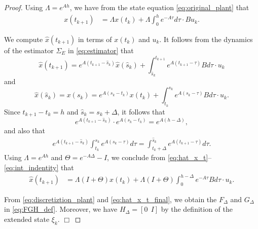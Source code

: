 \documentclass[letterpaper, 12pt, draftcls, onecolumn]{ieeeconf}
\begin{document}
\begin{proof}
	Using $\Lambda = e^{Ah}$,
	we have from the state equation
	\eqref{eq:original_plant} that
	\begin{align}
	\label{eq:discretiztion_plant}
	x(t_{k+1}) 
&=
	\Lambda x(t_k) + \Lambda 
	\int^{h}_{0} e^{-A\tau}  d\tau \cdot Bu_k.
	\end{align}
	
	We compute $\hat x(t_{k+1})$ in terms of $x(t_{k})$ and $u_k$.
	It follows from 
	the dynamics of the estimator $\Sigma_E$ in \eqref{eq:estimator} that
	\begin{equation}
	\label{eq:hat_x_t}
	\hat x(t_{k+1}) = 
	e^{A(t_{k+1} - \hat s_k)} \hat x(\hat s_{k})
	+ 
	\int^{t_{k+1}}_{\hat s_k} e^{A(t_{k+1} - \tau)} B d\tau \cdot u_k
	\end{equation}
	and
	\begin{equation}
	\label{eq:hat_x_hat_s}
	\hat x(\hat s_{k}) = x(s_k) = 
	e^{A(s_k-t_k)} x(t_k) + 
	\int^{s_{k}}_{t_k} e^{A(s_k - \tau)} B d\tau \cdot u_k.	
	\end{equation}
Since $t_{k+1} - t_{k} = h$ and $\hat s_{k} = s_k + \Delta$, it follows that
	\begin{equation}
	\label{eq:exp_identity}
	e^{A(t_{k+1} - \hat s_k)} \cdot e^{A(s_k-t_k)}
	= e^{A(h-\Delta)},
	\end{equation}
	and also that 
	\begin{align}
	\label{eq:int_indentity}
	e^{A(t_{k+1} - \hat s_k)}
	\int^{s_{k}}_{t_k} e^{A(s_k - \tau)} d\tau
	=
	\int^{\hat s_{k}}_{t_k+\Delta} e^{A(t_{k+1}  - \tau)} d\tau.
	\end{align}
	Using $\Lambda = e^{Ah}$ and $\Theta = e^{-A\Delta} - I$,
	we conclude 
from \eqref{eq:hat_x_t}--\eqref{eq:int_indentity} that
	\begin{align}
	\hat x(t_{k+1}) &= 
	\Lambda (I + \Theta) x(t_k) + 
	\Lambda (I + \Theta) \int^{h-\Delta}_{0} e^{-A\tau} B d\tau \cdot u_k.
	\label{eq:hat_x_t_final}
	\end{align}
	
	From \eqref{eq:discretiztion_plant} and \eqref{eq:hat_x_t_final},
	we obtain the $F_{\Delta}$ and $G_{\Delta}$ in \eqref{eq:FGH_def}.
	Moreover, 
	we have $H_{\Delta} = [0 ~~I]$
	by the definition of the extended state $\xi_k$. 
	\hspace*{\fill} $\Box$
\end{proof}
\end{document}
